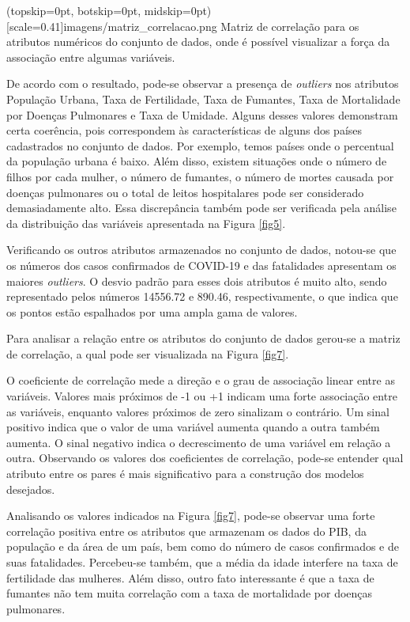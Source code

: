 \documentclass{ieeeaccess}
\begin{document}
\Figure[ht!](topskip=0pt, botskip=0pt, midskip=0pt)[scale=0.41]{imagens/{matriz_correlacao.png}}
{Matriz de correlação para os atributos numéricos do conjunto de dados, onde é possível visualizar a força da associação entre algumas variáveis. \label{fig7}}

De acordo com o resultado, pode-se observar a presença de \textit{outliers} nos atributos População Urbana, Taxa de Fertilidade, Taxa de Fumantes, Taxa de Mortalidade por Doenças Pulmonares e Taxa de Umidade. Alguns desses valores demonstram certa coerência, pois correspondem às características de alguns dos países cadastrados no conjunto de dados. Por exemplo, temos países onde o percentual da população urbana é baixo. Além disso, existem situações onde o número de filhos por cada mulher, o número de fumantes, o número de mortes causada por doenças pulmonares ou o total de leitos hospitalares pode ser considerado demasiadamente alto. Essa discrepância também pode ser verificada pela análise da distribuição das variáveis apresentada na Figura \ref{fig5}. 

Verificando os outros atributos armazenados no conjunto de dados,  notou-se que os números dos casos confirmados de COVID-19 e das fatalidades apresentam os maiores \textit{outliers}. O desvio padrão para esses dois atributos é muito alto, sendo representado pelos números 14556.72 e	890.46, respectivamente, o que indica que os pontos estão espalhados por uma ampla gama de valores.

Para analisar a relação entre os atributos do conjunto de dados gerou-se a matriz de correlação, a qual pode ser visualizada na Figura \ref{fig7}. 

O coeficiente de correlação mede a direção e o grau de associação linear entre as variáveis. Valores mais próximos de -1 ou +1 indicam uma forte associação entre as variáveis, enquanto valores próximos de zero sinalizam o contrário.  Um sinal positivo indica que o valor de uma variável aumenta quando a outra também aumenta. O sinal negativo indica o decrescimento de uma variável em relação a outra. Observando os valores dos coeficientes de correlação, pode-se entender qual atributo entre os pares é mais significativo para a construção dos modelos desejados. 

Analisando os valores indicados na Figura \ref{fig7}, pode-se observar uma forte correlação positiva entre os atributos que armazenam os dados do PIB, da população e da área de um país, bem como do número de casos confirmados e de suas fatalidades. Percebeu-se também, que a média da idade interfere na taxa de fertilidade das mulheres. Além disso, outro fato interessante é que a taxa de fumantes não tem muita correlação com a taxa de mortalidade por doenças pulmonares.
\end{document}
